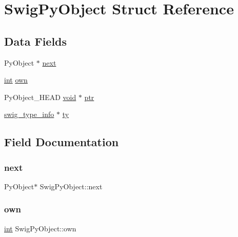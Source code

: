 \hypertarget{struct_swig_py_object}{}\section{Swig\+Py\+Object Struct Reference}
\label{struct_swig_py_object}
\subsection*{Data Fields}
\begin{DoxyCompactItemize}
\item 
Py\+Object $\ast$ \hyperlink{struct_swig_py_object_af7b93d7ae49a6f3bdf6511043fe8e839}{next}
\item 
\hyperlink{lp__lib_8h_adeb9ec6400320e4923ac9d836d509ddb}{int} \hyperlink{struct_swig_py_object_a83cb6489fb1b171467f06c091ae6f283}{own}
\item 
Py\+Object\+\_\+\+H\+E\+AD \hyperlink{lp__lib_8h_ac7828c7b2b31d2e11af17bdb6289c5d9}{void} $\ast$ \hyperlink{struct_swig_py_object_a41b1d569a8ba4fa9b1d87579c144891b}{ptr}
\item 
\hyperlink{structswig__type__info}{swig\+\_\+type\+\_\+info} $\ast$ \hyperlink{struct_swig_py_object_a510b5a6f66a8a33c0a54c3eeb83e5ba5}{ty}
\end{DoxyCompactItemize}


\subsection{Field Documentation}
\mbox{\label{struct_swig_py_object_af7b93d7ae49a6f3bdf6511043fe8e839}} 
\subsubsection{\texorpdfstring{next}{next}}
{\footnotesize\ttfamily Py\+Object$\ast$ Swig\+Py\+Object\+::next}

\mbox{\label{struct_swig_py_object_a83cb6489fb1b171467f06c091ae6f283}} 
\subsubsection{\texorpdfstring{own}{own}}
{\footnotesize\ttfamily \hyperlink{lp__lib_8h_adeb9ec6400320e4923ac9d836d509ddb}{int} Swig\+Py\+Object\+::own}

